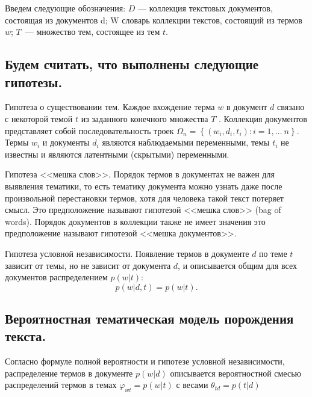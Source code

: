 \documentclass[12pt,twoside]{article}
\begin{document}
Введем следующие обозначения:  $D$ --- коллекция текстовых документов, состоящая из документов d; W  словарь коллекции текстов, состоящий из термов $w$; $T$~--- множество тем, состоящее из тем  $t$.

\subsection{Будем считать, что выполнены следующие гипотезы.}

Гипотеза о существовании тем. Каждое вхождение терма $w$ в документ $d$ связано
с некоторой темой $t$ из заданного конечного множества $T$ . Коллекция документов
представляет собой последовательность троек $\Omega_n = \left\{(w_i, d_i, t_i) : i=1,\dots \ n\right\}$. Термы $w_i$ и документы $d_i$ являются наблюдаемыми переменными, темы $t_i$ не известны
и являются латентными (скрытыми) переменными.

Гипотеза <<мешка слов>>. Порядок термов в документах не важен для выявления
тематики, то есть тематику документа можно узнать даже после произвольной перестановки термов, хотя для человека такой текст потеряет смысл. Это предположение
называют гипотезой <<мешка слов>> (bag of words). Порядок документов в коллекции
также не имеет значения  это предположение называют гипотезой <<мешка документов>>.

Гипотеза условной независимости. Появление термов в документе $d$ по теме $t$ зависит от темы, но не зависит от документа $d$, и описывается общим для всех документов распределением $p(w|t)$:
\begin{equation}
p(w|d, t) = p(w|t).
\end{equation}


\subsection{Вероятностная тематическая модель порождения текста.}
Согласно формуле полной вероятности и гипотезе условной независимости, распределение термов
в документе $p(w|d)$ описывается вероятностной смесью распределений термов в темах $\varphi_{wt} = p(w|t)$ с весами $\theta_{td} = p(t|d)$
\end{document}
